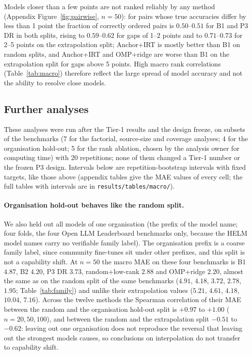 Models closer than a few points are not ranked reliably by any method (Appendix Figure~\ref{fig:pairwise}, $n{=}50$): for pairs whose true accuracies differ by less than 1 point the fraction of correctly ordered pairs is $0.50$--$0.51$ for B1 and P3 DR in both splits, rising to $0.59$--$0.62$ for gaps of 1--2 points and to $0.71$--$0.73$ for 2--5 points on the extrapolation split; Anchor+IRT is mostly better than B1 on random splits, and Anchor+IRT and OMP+ridge are worse than B1 on the extrapolation split for gaps above 5 points. High macro rank correlations (Table~\ref{tab:macro}) therefore reflect the large spread of model accuracy and not the ability to resolve close models.

\subsection{Further analyses}
These analyses were run after the Tier-1 results and the design freeze, on subsets of the benchmarks (7 for the factorial, source-size and coverage analyses; 4 for the organisation hold-out; 5 for the rank ablation, chosen by the analysis owner for computing time) with 20 repetitions; none of them changed a Tier-1 number or the frozen P3 design. Intervals below are repetition-bootstrap intervals with fixed targets, like those above (appendix tables give the MAE values of every cell; the full tables with intervals are in \texttt{results/tables/macro/}).

\paragraph{Organisation hold-out behaves like the random split.}
We also held out all models of one organisation (the prefix of the model name; four folds, the four Open LLM Leaderboard benchmarks only, because the HELM model names carry no verifiable family label). The organisation prefix is a coarse family label, since community fine-tunes sit under other prefixes, and this split is not a capability shift. At $n{=}50$ the macro MAE on these four benchmarks is B1 $4.87$, B2 $4.20$, P3 DR $3.73$, random+low-rank $2.88$ and OMP+ridge $2.20$, almost the same as on the random split of the same benchmarks ($4.91$, $4.18$, $3.72$, $2.78$, $1.95$; Table~\ref{tab:family}) and unlike their extrapolation values ($5.21$, $4.61$, $4.18$, $10.04$, $7.16$). Across the twelve methods the Spearman correlation of their MAE between the random and the organisation hold-out split is $+0.97$ to $+1.00$ ($n{=}20,50,100$), and between the random and the extrapolation split $-0.51$ to $-0.62$: leaving out one organisation does not reproduce the reversal that leaving out the strongest models causes, so conclusions on interpolation do not transfer to capability shift.

